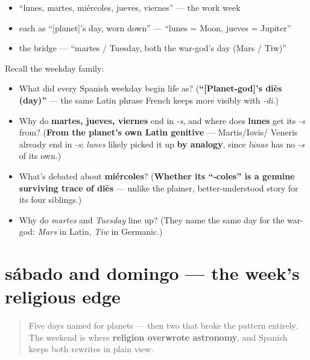 \begin{itemize}
\raggedright
  \item \textquotedblleft{}lunes, martes, miércoles, jueves, viernes\textquotedblright{} — the work week
  \item each as \textquotedblleft{}{[}planet{]}'s day, worn down\textquotedblright{} — \textquotedblleft{}lunes = Moon, jueves = Jupiter\textquotedblright{}
  \item the bridge — \textquotedblleft{}martes / Tuesday, both the war-god's day (Mars / Tiw)\textquotedblright{}
\end{itemize}

\begin{tcolorbox}[breakable,colback=teal!4,colframe=teal!35!black,title={Before you move on}]
Recall the weekday family:

\begin{itemize}
\raggedright
  \item What did every Spanish weekday begin life as? (\textbf{\textquotedblleft{}{[}Planet-god{]}'s diēs (day)\textquotedblright{}} — the same Latin phrase French keeps more visibly with \emph{-di}.)
  \item Why do \textbf{martes, jueves, viernes} end in \emph{-s}, and where does \textbf{lunes} get its \emph{-s} from? (\textbf{From the planet's own Latin genitive} — Martis/Iovis/ Veneris already end in \emph{-s}; \emph{lunes} likely picked it up \textbf{by analogy}, since \emph{lūnae} has no \emph{-s} of its own.)
  \item What's debated about \textbf{miércoles}? (\textbf{Whether its \textquotedblleft{}‑coles\textquotedblright{} is a genuine surviving trace of diēs} — unlike the plainer, better-understood story for its four siblings.)
  \item Why do \emph{martes} and \emph{Tuesday} line up? (They name the same day for the war-god: \emph{Mars} in Latin, \emph{Tiw} in Germanic.)
\end{itemize}
\end{tcolorbox}
\section[sábado, domingo]{sábado and domingo — the week's religious edge}

\label{lesson:ES-C21-sabado-domingo}



\begin{quote}
Five days named for planets — then two that broke the pattern entirely. The weekend is where \textbf{religion overwrote astronomy}, and Spanish keeps both rewrites in plain view.
\end{quote}

